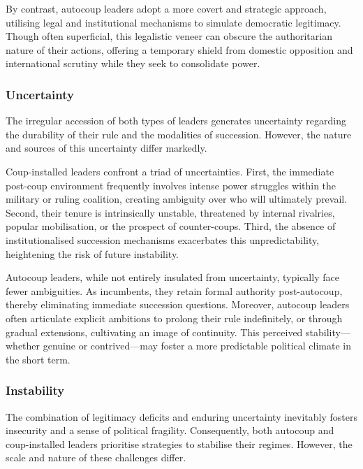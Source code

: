 \documentclass[
  12pt,
]{report}
\begin{document}
By contrast, autocoup leaders adopt a more covert and strategic
approach, utilising legal and institutional mechanisms to simulate
democratic legitimacy. Though often superficial, this legalistic veneer
can obscure the authoritarian nature of their actions, offering a
temporary shield from domestic opposition and international scrutiny
while they seek to consolidate power.

\subsubsection*{Uncertainty}\label{uncertainty}

The irregular accession of both types of leaders generates uncertainty
regarding the durability of their rule and the modalities of succession.
However, the nature and sources of this uncertainty differ markedly.

Coup-installed leaders confront a triad of uncertainties. First, the
immediate post-coup environment frequently involves intense power
struggles within the military or ruling coalition, creating ambiguity
over who will ultimately prevail. Second, their tenure is intrinsically
unstable, threatened by internal rivalries, popular mobilisation, or the
prospect of counter-coups. Third, the absence of institutionalised
succession mechanisms exacerbates this unpredictability, heightening the
risk of future instability.

Autocoup leaders, while not entirely insulated from uncertainty,
typically face fewer ambiguities. As incumbents, they retain formal
authority post-autocoup, thereby eliminating immediate succession
questions. Moreover, autocoup leaders often articulate explicit
ambitions to prolong their rule indefinitely, or through gradual
extensions, cultivating an image of continuity. This perceived
stability---whether genuine or contrived---may foster a more predictable
political climate in the short term.

\subsubsection*{Instability}\label{instability}

The combination of legitimacy deficits and enduring uncertainty
inevitably fosters insecurity and a sense of political fragility.
Consequently, both autocoup and coup-installed leaders prioritise
strategies to stabilise their regimes. However, the scale and nature of
these challenges differ.
\end{document}
